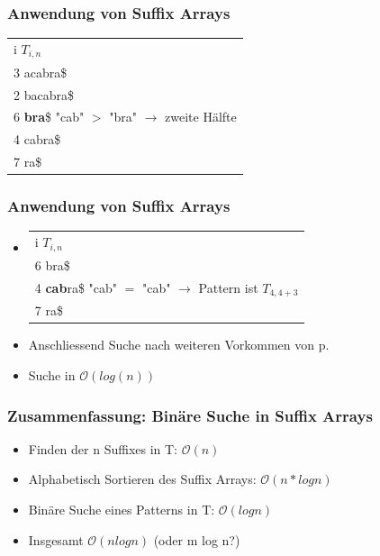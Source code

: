 \documentclass{beamer}
\begin{document}
\begin{frame}
\frametitle{Anwendung von Suffix Arrays}
\begin{tabular}{l}
	i $T_{i,n}$\\
3 acabra\$\\
2 bacabra\$\\
6 \color{red}\textbf{bra}\color{black}\$ "cab" $>$ "bra" $\rightarrow$ zweite H\"alfte\\
4 cabra\$\\
7 ra\$\\
	\end{tabular}
\end{frame}
\begin{frame}
\frametitle{Anwendung von Suffix Arrays}
\begin{itemize}
\item
\begin{tabular}{l}
	i $T_{i,n}$\\
6 bra\$\\
4 \color{red}\textbf{cab}\color{black}ra\$ "cab" $=$ "cab" $\rightarrow$ Pattern ist $T_{4,4+3}$\\
7 ra\$\\
	\end{tabular}\newline
\item Anschliessend Suche nach weiteren Vorkommen von p.
\item Suche in $\mathcal{O}(log (n))$
	\end{itemize}
\end{frame}
\begin{frame}
\frametitle{Zusammenfassung: Bin\"are Suche in Suffix Arrays}
\begin{itemize}
\item Finden der n Suffixes in T: ${ \scriptstyle \mathcal{O	}}(n)$
\item Alphabetisch Sortieren des Suffix Arrays: ${ \scriptstyle \mathcal{O	}}(n*log n)$
\item Bin\"are Suche eines Patterns in T: ${ \scriptstyle \mathcal{O	}}(log n)$
\item Insgesamt $\mathcal{O}(n log n)$ (oder m log n?)
\end{itemize}
\end{frame}
\end{document}
